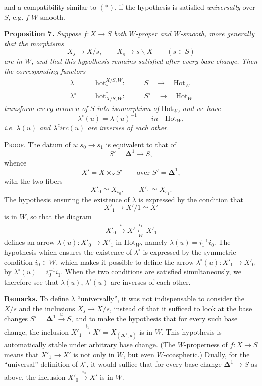 \documentclass[11pt]{article}
\newcommand{\printedpage}[1]{\marginpar{\footnotesize p.~#1}}
\newcommand{\msp}[1]{\marginpar{\footnotesize [#1]}}
\newcommand{\Hot}{\mathrm{Hot}}
\newcommand{\hot}{\mathrm{hot}}
\begin{document}
\leavevmode\msp{page 35}and a compatibility similar to $(*)$, if the hypothesis is satisfied \textit{universally} over $S$, e.g. $f$ $W$-smooth.

\textbf{Proposition 7.} \textit{Suppose $f : X\longrightarrow S$ both $W$-proper and $W$-smooth, more generally that the morphisms}
\[
X_s\longrightarrow X/s,\qquad X_s\longrightarrow s\backslash X\qquad(s\in S)
\]
\textit{are in $W$, and that this hypothesis remains satisfied after every base change. Then the corresponding functors} %
\[
\begin{aligned}
\lambda &\;=\;\hot_*^{X/S,W} : &&\quad S \quad\longrightarrow\quad \Hot_W\\
\lambda^\circ &\;=\;\hot^*_{X/S,W} : &&\quad S^\circ \quad\longrightarrow\quad \Hot_W
\end{aligned}
\]
\textit{transform every arrow $u$ of $S$ into} \textit{isomorphism of} $\Hot_W$\textit{, and we have}
\[
\lambda^\circ(u)=\lambda(u)^{-1}\qquad\textit{in}\quad\Hot_W,
\]
\textit{i.e. $\lambda(u)$ and $\lambda^c irc(u)$ are inverses of each other.} %

\textsc{Proof}. The datum of $u : s_0\longrightarrow s_1$ is equivalent to that of
\[
S'=\mathbf{\Delta}^1\longrightarrow S,
\]
whence
\[
X'=X\times_S S'\qquad\text{over } S'=\mathbf{\Delta}^1,
\]
with the two fibers
\[
X'_0\simeq X_{s_0},\qquad X'_1\simeq X_{s_1}.
\]
The hypothesis ensuring the existence of $\lambda$ is expressed by the condition that
\[
X'_1\longrightarrow X'/1\simeq X'
\]
\printedpage{28}
\msp{page 36}is in $W$, so that the diagram
\[
X'_0\xrightarrow{i_0}X'\xleftarrow[W]{i_1}X'_1
\]
defines an arrow $\lambda(u) : X'_0\longrightarrow X'_1$ in $\Hot_W$, namely $\lambda(u)=i_1^{-1}i_0$. The hypothesis which ensures the existence of $\lambda^\circ$ is expressed by the symmetric condition $i_0\in W$, which makes it possible to define the arrow $\lambda^\circ(u) : X'_1\longrightarrow X'_0$ by $\lambda^\circ(u)=i_0^{-1}i_1$. When the two conditions are satisfied simultaneously, we therefore see that $\lambda(u)$, $\lambda^\circ(u)$ are inverses of each other.

\textbf{Remarks.} To define $\lambda$ ``universally'', it was not indispensable to consider the $X/s$ and the inclusions $X_s\longrightarrow X/s$, instead of that it sufficed to look at the base changes $S'=\mathbf{\Delta}^1\xrightarrow{u}S$, and to make the hypothesis that for every such base change, the inclusion $X'_1\xrightarrow{i_1}X'=X_{(\mathbf{\Delta}^1,u)}$ is in $W$. This hypothesis is automatically stable under arbitrary base change. (The $W$-properness of $f : X\longrightarrow S$ means that $X'_1\longrightarrow X'$ is not only in $W$, but even $W$-coaspheric.) Dually, for the ``universal'' definition of $\lambda^\circ$, it would suffice that for every base change $\mathbf{\Delta}^1\longrightarrow S$ as above, the inclusion $X'_0\xrightarrow{i_0}X'$ is in $W$.
\end{document}
